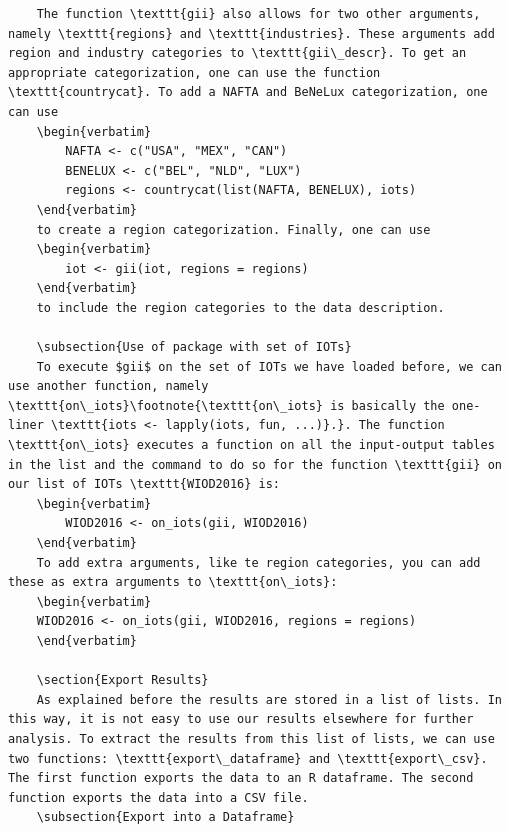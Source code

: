 \documentclass[10pt,a4paper]{paper}
\begin{document}
\begin{itemize}
\begin{Verbatim}
	The function \texttt{gii} also allows for two other arguments, namely \texttt{regions} and \texttt{industries}. These arguments add region and industry categories to \texttt{gii\_descr}. To get an appropriate categorization, one can use the function \texttt{countrycat}. To add a NAFTA and BeNeLux categorization, one can use
	\begin{verbatim}
		NAFTA <- c("USA", "MEX", "CAN")
		BENELUX <- c("BEL", "NLD", "LUX") 
		regions <- countrycat(list(NAFTA, BENELUX), iots)
	\end{verbatim} 
	to create a region categorization. Finally, one can use
	\begin{verbatim}
		iot <- gii(iot, regions = regions)
	\end{verbatim}
	to include the region categories to the data description.
	
	\subsection{Use of package with set of IOTs}
	To execute $gii$ on the set of IOTs we have loaded before, we can use another function, namely \texttt{on\_iots}\footnote{\texttt{on\_iots} is basically the one-liner \texttt{iots <- lapply(iots, fun, ...)}.}. The function \texttt{on\_iots} executes a function on all the input-output tables in the list and the command to do so for the function \texttt{gii} on our list of IOTs \texttt{WIOD2016} is:
	\begin{verbatim}
		WIOD2016 <- on_iots(gii, WIOD2016)
	\end{verbatim}
	To add extra arguments, like te region categories, you can add these as extra arguments to \texttt{on\_iots}:
	\begin{verbatim}
	WIOD2016 <- on_iots(gii, WIOD2016, regions = regions)
	\end{verbatim}
	
	\section{Export Results}
	As explained before the results are stored in a list of lists. In this way, it is not easy to use our results elsewhere for further analysis. To extract the results from this list of lists, we can use two functions: \texttt{export\_dataframe} and \texttt{export\_csv}. The first function exports the data to an R dataframe. The second function exports the data into a CSV file.
	\subsection{Export into a Dataframe}
	

\end{Verbatim}
\end{itemize}
\end{document}
